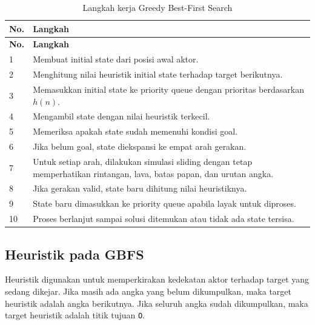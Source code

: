 \begin{longtable}{|p{1.2cm}|p{12.8cm}|}
	\caption{Langkah kerja Greedy Best-First Search} \\
	\hline
	\rowcolor{orange!20}
	\textbf{No.} & \textbf{Langkah} \\
	\hline
	\endfirsthead
	
	\hline
	\rowcolor{orange!20}
	\textbf{No.} & \textbf{Langkah} \\
	\hline
	\endhead
	
	1 & Membuat initial state dari posisi awal aktor. \\
	\hline
	2 & Menghitung nilai heuristik initial state terhadap target berikutnya. \\
	\hline
	3 & Memasukkan initial state ke priority queue dengan prioritas berdasarkan $h(n)$. \\
	\hline
	4 & Mengambil state dengan nilai heuristik terkecil. \\
	\hline
	5 & Memeriksa apakah state sudah memenuhi kondisi goal. \\
	\hline
	6 & Jika belum goal, state diekspansi ke empat arah gerakan. \\
	\hline
	7 & Untuk setiap arah, dilakukan simulasi sliding dengan tetap memperhatikan rintangan, lava, batas papan, dan urutan angka. \\
	\hline
	8 & Jika gerakan valid, state baru dihitung nilai heuristiknya. \\
	\hline
	9 & State baru dimasukkan ke priority queue apabila layak untuk diproses. \\
	\hline
	10 & Proses berlanjut sampai solusi ditemukan atau tidak ada state tersisa. \\
	\hline
\end{longtable}

\subsection{Heuristik pada GBFS}

Heuristik digunakan untuk memperkirakan kedekatan aktor terhadap target yang sedang dikejar. 
Jika masih ada angka yang belum dikumpulkan, maka target heuristik adalah angka berikutnya. 
Jika seluruh angka sudah dikumpulkan, maka target heuristik adalah titik tujuan \texttt{O}.

